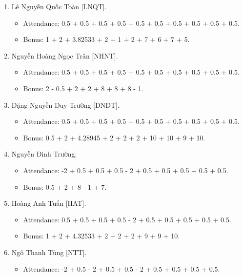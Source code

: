 \documentclass{article}
\begin{document}
\begin{enumerate}
    \begin{itemize}
        \item Attendance: 0.5 + 0.5 + 0.5 + 0.5 + 0.5 + 0.5 + 0.5 + 0.5 + 0.5 + 0.5.
        \item Bonus: 1 + 2 + 3.8487 + 2.5 + 8 + 7.
    \end{itemize}
    \item {\sc Lê Nguyễn Quốc Toàn [LNQT].}
    \begin{itemize}
        \item Attendance: 0.5 + 0.5 + 0.5 + 0.5 + 0.5 + 0.5 + 0.5 + 0.5 + 0.5 + 0.5.
        \item Bonus: 1 + 2 + 3.82533 + 2 + 1 + 2 + 7 + 6 + 7 + 5.
    \end{itemize}
    \item {\sc Nguyễn Hoàng Ngọc Trân [NHNT].}
    \begin{itemize}
        \item Attendance: 0.5 + 0.5 + 0.5 + 0.5 + 0.5 + 0.5 + 0.5 + 0.5 + 0.5 + 0.5.
        \item Bonus: 2 - 0.5 + 2 + 2 + 8 + 8 + 8 - 1.
    \end{itemize}
    \item {\sc Đặng Nguyễn Duy Trường [DNDT].}
    \begin{itemize}
        \item Attendance: 0.5 + 0.5 + 0.5 + 0.5 + 0.5 + 0.5 + 0.5 + 0.5 + 0.5 + 0.5.
        \item Bonus: 0.5 + 2 + 4.28945 + 2 + 2 + 2 + 10 + 10 + 9 + 10.
    \end{itemize}
    \item {\sc Nguyễn Đình Trường.}
    \begin{itemize}
        \item Attendance: -2 + 0.5 + 0.5 + 0.5 - 2 + 0.5 + 0.5 + 0.5 + 0.5 + 0.5.
        \item Bonus: 0.5 + 2 + 8 - 1 + 7.
    \end{itemize}
    \item {\sc Hoàng Anh Tuấn [HAT].}
    \begin{itemize}
        \item Attendance: 0.5 + 0.5 + 0.5 + 0.5 - 2 + 0.5 + 0.5 + 0.5 + 0.5 + 0.5.
        \item Bonus: 1 + 2 + 4.32533 + 2 + 2 + 2 + 9 + 9 + 10.
    \end{itemize}
    \item {\sc Ngô Thanh Tùng [NTT].}
    \begin{itemize}
        \item Attendance: -2 + 0.5 - 2 + 0.5 + 0.5 - 2 + 0.5 + 0.5 + 0.5 + 0.5.

\end{itemize}
\end{enumerate}
\end{document}
